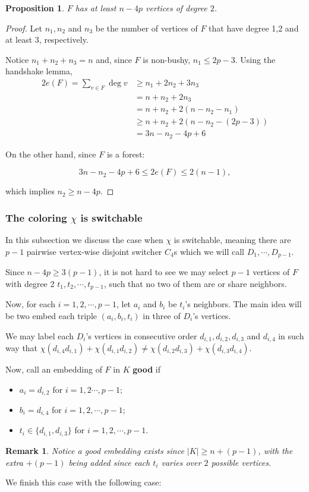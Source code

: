 \documentclass{article}
\numberwithin{table}{section}
\newtheorem{prop}[theorem]{Proposition}
\newtheorem{rem}[theorem]{Remark}
\begin{document}
\begin{prop}
    $F$ has at least $n-4p$ vertices of degree $2$.
\end{prop}
\begin{proof}
    Let $n_1,n_2$ and $n_3$ be the number of vertices of $F$ that have degree 1,2 and at least 3, respectively.

    Notice $n_1+n_2+n_3 = n$ and, since $F$ is non-bushy, $n_1\le 2p-3$. Using the handshake lemma,
\begin{align*}
    2e(F) = \sum_{v\in F}\deg v&\geq n_1+2n_2+3n_3 
    \\&= n+n_2+2n_3
    \\& =n+n_2+2(n-n_2-n_1)
    \\&\geq n+n_2+2(n-n_2-(2p-3)) 
    \\&= 3n-n_2-4p+6 
\end{align*}
    

    On the other hand, since $F$ is a forest:

    $$3n-n_2-4p+6\leq 2e(F)\leq 2(n-1),$$
    
    which implies $n_2 \geq n-4p$.

\end{proof}

\subsubsection{The coloring $\chi$ is switchable}\label{subsec: switch}

In this subsection we discuss the case when $\chi$ is switchable, meaning there are {~$p-1$} pairwise vertex-wise disjoint switcher $C_4$s which we will call $D_1,\cdots,D_{p-1}$.
\medskip

Since $n-4p\geq 3(p-1)$, it is not hard to see we may select $p-1$ vertices of $F$ with degree 2 $t_1,t_2,\cdots,t_{p-1}$, such that no two of them are or share neighbors. 


Now, for each $i=1,2,\cdots,p-1$, let $a_i$ and $b_i$ be $t_i$'s neighbors. The main idea will be two embed each triple $(a_i,b_i,t_i)$ in three of $D_i$'s vertices.


\medskip

We may label each $D_i$'s vertices in consecutive order $d_{i,1},d_{i,2},d_{i,3}$ and $d_{i,4}$ in such way that $\chi(d_{i,4}d_{i,1})+\chi(d_{i,1}d_{i,2}) \neq \chi(d_{i,2}d_{i,3})+\chi(d_{i,3}d_{i,4})$.
\medskip

Now, call an embedding of $F$ in $K$ \textbf{good} if
\begin{itemize}
    \item $a_i=d_{i,2}$ for $i=1,2\cdots,p-1$;
    \item $b_i=d_{i,4}$ for $i=1,2,\cdots, p-1$;
    \item $t_i\in \{d_{i,1},d_{i,3}\}$ for $i=1,2,\cdots,p-1$.
\end{itemize}
\begin{rem}
    Notice a good embedding exists since $|K|\geq n+(p-1)$, with the extra $+(p-1)$ being added since each $t_i$ varies over $2$ possible vertices.
\end{rem}
We finish this case with the following case:
\end{document}
